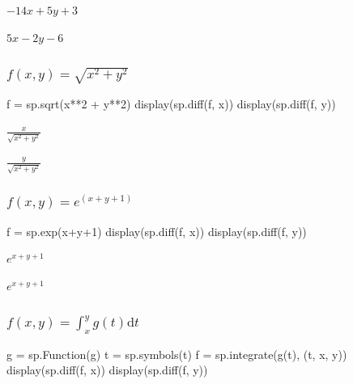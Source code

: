 \documentclass[
  letterpaper,
  DIV=11,
  numbers=noendperiod]{scrartcl}
\newenvironment{Shaded}{\begin{snugshade}}{\end{snugshade}}
\newcommand{\DecValTok}[1]{\textcolor[rgb]{0.68,0.00,0.00}{#1}}
\newcommand{\NormalTok}[1]{\textcolor[rgb]{0.00,0.23,0.31}{#1}}
\newcommand{\OperatorTok}[1]{\textcolor[rgb]{0.37,0.37,0.37}{#1}}
\newcommand{\StringTok}[1]{\textcolor[rgb]{0.13,0.47,0.30}{#1}}
\begin{document}
$\displaystyle - 14 x + 5 y + 3$

$\displaystyle 5 x - 2 y - 6$

\hypertarget{fx-y-sqrtx2y2}{%
\subsubsection{\texorpdfstring{\(f(x, y) = \sqrt{x^2+y^2}\)}{f(x, y) = \textbackslash sqrt\{x\^{}2+y\^{}2\}}}\label{fx-y-sqrtx2y2}}

\begin{Shaded}
\begin{Highlighting}[numbers=left,,]
\NormalTok{f }\OperatorTok{=}\NormalTok{ sp.sqrt(x}\OperatorTok{**}\DecValTok{2} \OperatorTok{+}\NormalTok{ y}\OperatorTok{**}\DecValTok{2}\NormalTok{)}
\NormalTok{display(sp.diff(f, x))}
\NormalTok{display(sp.diff(f, y))}
\end{Highlighting}
\end{Shaded}

$\displaystyle \frac{x}{\sqrt{x^{2} + y^{2}}}$

$\displaystyle \frac{y}{\sqrt{x^{2} + y^{2}}}$

\hypertarget{fx-y-exy1}{%
\subsubsection{\texorpdfstring{\(f(x, y) = e^{(x+y+1)}\)}{f(x, y) = e\^{}\{(x+y+1)\}}}\label{fx-y-exy1}}

\begin{Shaded}
\begin{Highlighting}[numbers=left,,]
\NormalTok{f }\OperatorTok{=}\NormalTok{ sp.exp(x}\OperatorTok{+}\NormalTok{y}\OperatorTok{+}\DecValTok{1}\NormalTok{) }
\NormalTok{display(sp.diff(f, x))}
\NormalTok{display(sp.diff(f, y))}
\end{Highlighting}
\end{Shaded}

$\displaystyle e^{x + y + 1}$

$\displaystyle e^{x + y + 1}$

\hypertarget{fx-y-int_xy-gt-mathrmdt}{%
\subsubsection{\texorpdfstring{\(f(x, y) = \int_x^y g(t) \mathrm{d}t\)}{f(x, y) = \textbackslash int\_x\^{}y g(t) \textbackslash mathrm\{d\}t}}\label{fx-y-int_xy-gt-mathrmdt}}

\begin{Shaded}
\begin{Highlighting}[numbers=left,,]
\NormalTok{g }\OperatorTok{=}\NormalTok{ sp.Function(}\StringTok{\textquotesingle{}g\textquotesingle{}}\NormalTok{)}
\NormalTok{t }\OperatorTok{=}\NormalTok{ sp.symbols(}\StringTok{\textquotesingle{}t\textquotesingle{}}\NormalTok{)}
\NormalTok{f }\OperatorTok{=}\NormalTok{ sp.integrate(g(t), (t, x, y))}
\NormalTok{display(sp.diff(f, x))}
\NormalTok{display(sp.diff(f, y))}
\end{Highlighting}
\end{Shaded}
\end{document}
